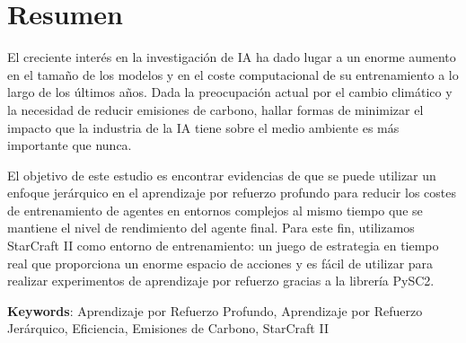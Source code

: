\chapter*{Resumen}

El creciente interés en la investigación de IA ha dado lugar a un enorme aumento en el tamaño de los modelos y en el coste computacional de su entrenamiento a lo largo de los últimos años. Dada la preocupación actual por el cambio climático y la necesidad de reducir emisiones de carbono, hallar formas de minimizar el impacto que la industria de la IA tiene sobre el medio ambiente es más importante que nunca.

El objetivo de este estudio es encontrar evidencias de que se puede utilizar un enfoque jerárquico en el aprendizaje por refuerzo profundo para reducir los costes de entrenamiento de agentes en entornos complejos al mismo tiempo que se mantiene el nivel de rendimiento del agente final. Para este fin, utilizamos StarCraft II como entorno de entrenamiento: un juego de estrategia en tiempo real que proporciona un enorme espacio de acciones y es fácil de utilizar para realizar experimentos de aprendizaje por refuerzo gracias a la librería PySC2.

\vspace{1.5cm}

\textbf{Keywords}: Aprendizaje por Refuerzo Profundo, Aprendizaje por Refuerzo Jerárquico, Eficiencia, Emisiones de Carbono, StarCraft II